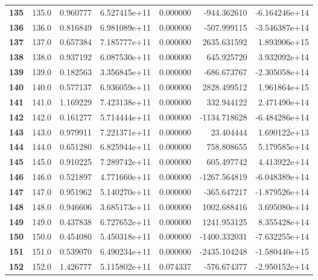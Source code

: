\documentclass{report}[12pt]
\begin{document}
\begin{center}
\begin{tabular}{lrrrrrr}
\textbf{135 } &          135.0 &   0.960777 &  6.527415e+11 &    0.000000 &  -944.362610 & -6.164246e+14 \\
\textbf{136 } &          136.0 &   0.816849 &  6.981089e+11 &    0.000000 &  -507.999115 & -3.546387e+14 \\
\textbf{137 } &          137.0 &   0.657384 &  7.185777e+11 &    0.000000 &  2635.631592 &  1.893906e+15 \\
\textbf{138 } &          138.0 &   0.937192 &  6.087530e+11 &    0.000000 &   645.925720 &  3.932092e+14 \\
\textbf{139 } &          139.0 &   0.182563 &  3.356845e+11 &    0.000000 &  -686.673767 & -2.305058e+14 \\
\textbf{140 } &          140.0 &   0.577137 &  6.936059e+11 &    0.000000 &  2828.499512 &  1.961864e+15 \\
\textbf{141 } &          141.0 &   1.169229 &  7.423138e+11 &    0.000000 &   332.944122 &  2.471490e+14 \\
\textbf{142 } &          142.0 &   0.161277 &  5.714444e+11 &    0.000000 & -1134.718628 & -6.484286e+14 \\
\textbf{143 } &          143.0 &   0.979911 &  7.221371e+11 &    0.000000 &    23.404444 &  1.690122e+13 \\
\textbf{144 } &          144.0 &   0.651280 &  6.825944e+11 &    0.000000 &   758.808655 &  5.179585e+14 \\
\textbf{145 } &          145.0 &   0.910225 &  7.289742e+11 &    0.000000 &   605.497742 &  4.413922e+14 \\
\textbf{146 } &          146.0 &   0.521897 &  4.771660e+11 &    0.000000 & -1267.564819 & -6.048389e+14 \\
\textbf{147 } &          147.0 &   0.951962 &  5.140270e+11 &    0.000000 &  -365.647217 & -1.879526e+14 \\
\textbf{148 } &          148.0 &   0.946606 &  3.685173e+11 &    0.000000 &  1002.688416 &  3.695080e+14 \\
\textbf{149 } &          149.0 &   0.437838 &  6.727652e+11 &    0.000000 &  1241.953125 &  8.355428e+14 \\
\textbf{150 } &          150.0 &   0.454080 &  5.450318e+11 &    0.000000 & -1400.332031 & -7.632255e+14 \\
\textbf{151 } &          151.0 &   0.539070 &  6.490234e+11 &    0.000000 & -2435.104248 & -1.580440e+15 \\
\textbf{152 } &          152.0 &   1.426777 &  5.115802e+11 &    0.074337 &  -576.674377 & -2.950152e+14 \\

\end{tabular}
\end{center}
\end{document}
